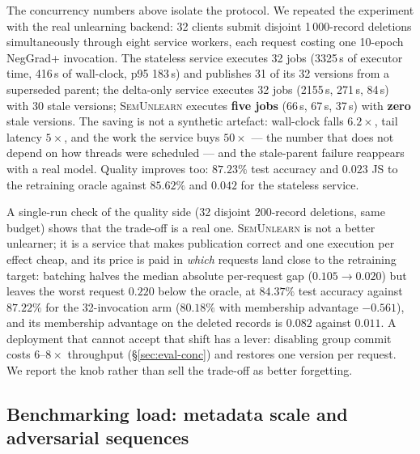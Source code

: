 \documentclass[conference]{IEEEtran}
\newcommand{\sys}{\textsc{SemUnlearn}}
\begin{document}
The concurrency numbers above isolate the protocol.  We repeated the experiment with the
real unlearning backend: 32 clients submit disjoint 1\,000-record deletions simultaneously
through eight service workers, each request costing one 10-epoch NegGrad+ invocation.  The
stateless service executes 32 jobs (3325\,s of executor time, 416\,s of wall-clock, p95
183\,s) and publishes 31 of its 32 versions from a superseded parent; the delta-only service
executes 32 jobs (2155\,s, 271\,s, 84\,s) with 30 stale versions; \sys{} executes
\textbf{five jobs} (66\,s, 67\,s, 37\,s) with \textbf{zero} stale versions.  The saving is
not a synthetic artefact: wall-clock falls $6.2\times$, tail latency $5\times$, and the work
the service buys $50\times$ --- the number that does not depend on how threads were
scheduled --- and the stale-parent failure reappears with a real model.  Quality improves
too: $87.23\%$ test accuracy and $0.023$ JS to the retraining oracle against $85.62\%$ and
$0.042$ for the stateless service.

A single-run check of the quality side (32 disjoint 200-record deletions, same budget) shows
that the trade-off is a real one.  \sys{} is not a better unlearner; it is a service that makes
publication correct and one execution per effect cheap, and its price is paid in \emph{which}
requests land close to the retraining target: batching halves the median absolute per-request
gap ($0.105\to0.020$) but leaves the worst request $0.220$ below the oracle, at $84.37\%$ test
accuracy against $87.22\%$ for the 32-invocation arm ($80.18\%$ with membership advantage
$-0.561$), and its membership advantage on the deleted records is $0.082$ against $0.011$.  A
deployment that cannot accept that shift has a lever: disabling group commit costs
$6$--$8\times$ throughput (\S\ref{sec:eval-conc}) and restores one version per request.  We
report the knob rather than sell the trade-off as better forgetting.

\subsection{Benchmarking load: metadata scale and adversarial sequences}
\label{sec:eval-load}
\end{document}
